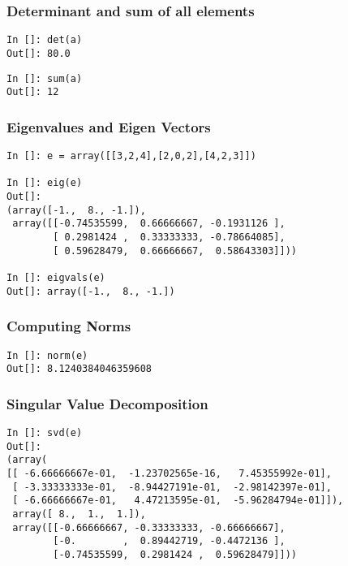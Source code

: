 \documentclass[14pt,compress]{beamer}
\begin{document}
\begin{frame}[fragile]
\frametitle{Determinant and sum of all elements}
\begin{lstlisting}
In []: det(a)
Out[]: 80.0
\end{lstlisting}
  \begin{lstlisting}
In []: sum(a)
Out[]: 12
  \end{lstlisting}

\end{frame}

\begin{frame}[fragile]
\frametitle{Eigenvalues and Eigen Vectors}
\begin{small}
\begin{lstlisting}
In []: e = array([[3,2,4],[2,0,2],[4,2,3]])

In []: eig(e)
Out[]: 
(array([-1.,  8., -1.]),
 array([[-0.74535599,  0.66666667, -0.1931126 ],
        [ 0.2981424 ,  0.33333333, -0.78664085],
        [ 0.59628479,  0.66666667,  0.58643303]]))

In []: eigvals(e)
Out[]: array([-1.,  8., -1.])
\end{lstlisting}
\end{small}
\end{frame}

\begin{frame}[fragile]
\frametitle{Computing Norms}
\begin{lstlisting}
In []: norm(e)
Out[]: 8.1240384046359608
\end{lstlisting}
\end{frame}

\begin{frame}[fragile]
  \frametitle{Singular Value Decomposition}
  \begin{small}
  \begin{lstlisting}
In []: svd(e)
Out[]: 
(array(
[[ -6.66666667e-01,  -1.23702565e-16,   7.45355992e-01],
 [ -3.33333333e-01,  -8.94427191e-01,  -2.98142397e-01],
 [ -6.66666667e-01,   4.47213595e-01,  -5.96284794e-01]]),
 array([ 8.,  1.,  1.]),
 array([[-0.66666667, -0.33333333, -0.66666667],
        [-0.        ,  0.89442719, -0.4472136 ],
        [-0.74535599,  0.2981424 ,  0.59628479]]))
  \end{lstlisting}
  \end{small}
\end{frame}
\end{document}
